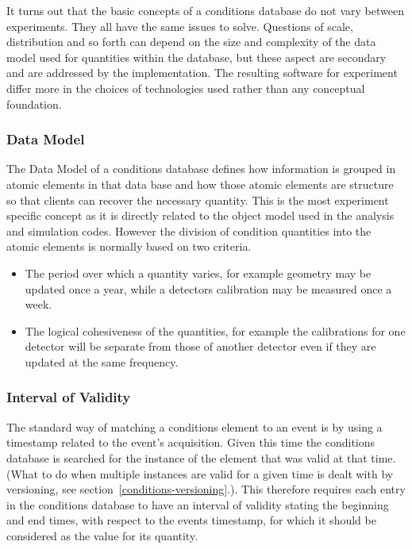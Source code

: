 It turns out that the basic concepts of a conditions database do not vary between experiments. They all have the same issues to solve. Questions of scale, distribution and so forth can depend on the size and complexity of the data model used for quantities within the database, but these aspect are secondary and are addressed by the implementation. The resulting software for experiment differ more in the choices of technologies used rather than any conceptual foundation.

\subsubsection{Data Model}

The Data Model of a conditions database defines how information is grouped in atomic elements in that data base and how those atomic elements are structure so that clients can recover the necessary quantity. This is the most experiment specific concept as it is directly related to the object model used in the analysis and simulation codes. However the division of condition quantities into the atomic elements is normally based on two criteria.

\begin{itemize}
\item The period over which a quantity varies, for example geometry may be updated once a year, while a detectors calibration may be measured once a week.

\item The logical cohesiveness of the quantities, for example the calibrations for one detector will be separate from those of another detector even if they are updated at the same frequency.
\end{itemize}


\subsubsection{Interval of Validity}

The standard way of matching a conditions element to an event is by using a timestamp related to the event's acquisition. Given this time the conditions database is searched for the instance of the element that was valid at that time. (What to do when multiple instances are valid for a given time is dealt with by versioning, see section~\ref{conditions-versioning}.). This therefore requires each entry in the conditions database to have an interval of validity stating the beginning and end times, with respect to the events timestamp, for which it should be considered as the value for its quantity.


